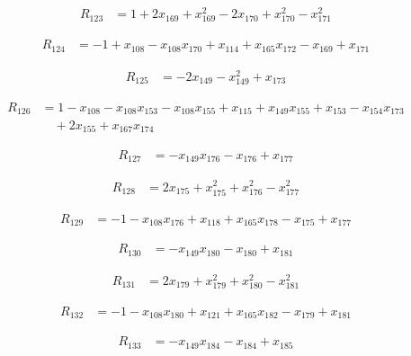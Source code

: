 \begin{align*}
R_{123} &= 1 +2 x_{169} +x_{169}^{2} -2 x_{170} +x_{170}^{2} -x_{171}^{2}
\end{align*}

\begin{align*}
R_{124} &= -1 +x_{108} -x_{108} x_{170} +x_{114} +x_{165} x_{172} -x_{169} +x_{171}
\end{align*}

\begin{align*}
R_{125} &= -2 x_{149} -x_{149}^{2} +x_{173}
\end{align*}

\begin{align*}
R_{126} &= 1 -x_{108} -x_{108} x_{153} -x_{108} x_{155} +x_{115} +x_{149} x_{155} +x_{153} -x_{154} x_{173} \\
&\quad +2 x_{155} +x_{167} x_{174}
\end{align*}

\begin{align*}
R_{127} &= -x_{149} x_{176} -x_{176} +x_{177}
\end{align*}

\begin{align*}
R_{128} &= 2 x_{175} +x_{175}^{2} +x_{176}^{2} -x_{177}^{2}
\end{align*}

\begin{align*}
R_{129} &= -1 -x_{108} x_{176} +x_{118} +x_{165} x_{178} -x_{175} +x_{177}
\end{align*}

\begin{align*}
R_{130} &= -x_{149} x_{180} -x_{180} +x_{181}
\end{align*}

\begin{align*}
R_{131} &= 2 x_{179} +x_{179}^{2} +x_{180}^{2} -x_{181}^{2}
\end{align*}

\begin{align*}
R_{132} &= -1 -x_{108} x_{180} +x_{121} +x_{165} x_{182} -x_{179} +x_{181}
\end{align*}

\begin{align*}
R_{133} &= -x_{149} x_{184} -x_{184} +x_{185}
\end{align*}

